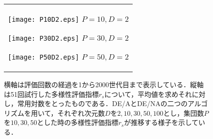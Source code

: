 \documentclass[a4paper,11pt,oneside,openany]{jsbook}
\begin{document}
\begin{figure}[htbp]
  \caption{横軸は評価回数の経過を1から2000世代目まで表示している．縦軸は51回試行した多様性評価指標$r_s$について，平均値を求めそれに対し，常用対数をとったものである．DE/AとDE/NAの二つのアルゴリズムを用いて，それぞれ次元数$D$を$2,10,30,50,100$とし，集団数$P$を$10,30,50$とした時の多様性評価指標$r_s$が推移する様子を示している．}
  \begin{center}
    \begin{tabular}{c}
      \begin{minipage}{0.33\hsize}
        \begin{center}
          \texttt{[image: P10D2.eps]}
          \hspace{1.2cm}$P=10, D=2
 $       \end{center}
      \end{minipage}

      \begin{minipage}{0.33\hsize}
        \begin{center}
          \texttt{[image: P30D2.eps]}
          \hspace{1.2cm}$P=30, D=2
 $       \end{center}
      \end{minipage}

      \begin{minipage}{0.33\hsize}
        \begin{center}
          \texttt{[image: P50D2.eps]}
          \hspace{1.2cm}$P=50, D=2
 $       \end{center}
      \end{minipage}
    \end{tabular}
  \end{center}
\end{figure}
\end{document}
